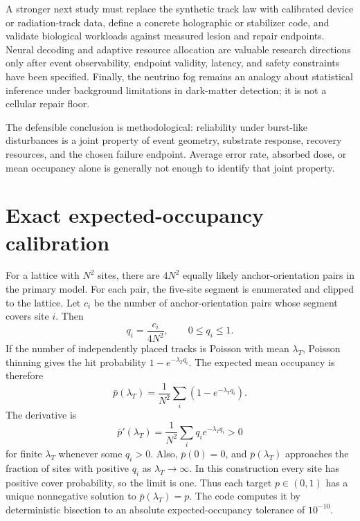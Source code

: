 \documentclass[11pt,a4paper,oneside]{article}
\newenvironment{resultbox}{\begin{tcolorbox}[colback=teal!5,colframe=teal!65!black,boxrule=.8pt,arc=2mm,title=Central result]}{\end{tcolorbox}}
\begin{document}
A stronger next study must replace the synthetic track law with calibrated device or radiation-track data, define a concrete holographic or stabilizer code, and validate biological workloads against measured lesion and repair endpoints. Neural decoding and adaptive resource allocation are valuable research directions only after event observability, endpoint validity, latency, and safety constraints have been specified. Finally, the neutrino fog remains an analogy about statistical inference under background limitations in dark-matter detection; it is not a cellular repair floor.

\begin{resultbox}
The defensible conclusion is methodological: reliability under burst-like disturbances is a joint property of event geometry, substrate response, recovery resources, and the chosen failure endpoint. Average error rate, absorbed dose, or mean occupancy alone is generally not enough to identify that joint property.
\end{resultbox}

\appendix
\section{Exact expected-occupancy calibration}
\label{app:calibration}
For a lattice with \(N^2\) sites, there are \(4N^2\) equally likely anchor-orientation pairs in the primary model. For each pair, the five-site segment is enumerated and clipped to the lattice. Let \(c_i\) be the number of anchor-orientation pairs whose segment covers site \(i\). Then
\begin{equation}\label{eq:qi}
q_i=\frac{c_i}{4N^2},\qquad 0\le q_i\le1.
\end{equation}
If the number of independently placed tracks is Poisson with mean \(\lambda_T\), Poisson thinning gives the hit probability \(1-e^{-\lambda_Tq_i}\). The expected mean occupancy is therefore
\begin{equation}\label{eq:meanocc}
\bar p(\lambda_T)=\frac{1}{N^2}\sum_i\left(1-e^{-\lambda_Tq_i}\right).
\end{equation}
The derivative is
\begin{equation}\label{eq:derivative}
\bar p'(\lambda_T)=\frac{1}{N^2}\sum_i q_i e^{-\lambda_Tq_i}>0
\end{equation}
for finite \(\lambda_T\) whenever some \(q_i>0\). Also, \(\bar p(0)=0\), and \(\bar p(\lambda_T)\) approaches the fraction of sites with positive \(q_i\) as \(\lambda_T\to\infty\). In this construction every site has positive cover probability, so the limit is one. Thus each target \(p\in(0,1)\) has a unique nonnegative solution to \(\bar p(\lambda_T)=p\). The code computes it by deterministic bisection to an absolute expected-occupancy tolerance of \(10^{-10}\).
\end{document}

